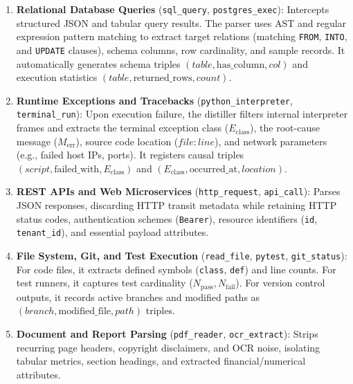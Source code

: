 \documentclass[lettersize,journal]{IEEEtran}
\begin{document}
\begin{enumerate}
    \item \textbf{Relational Database Queries} (\texttt{sql\_query}, \texttt{postgres\_exec}): Intercepts structured JSON and tabular query results. The parser uses AST and regular expression pattern matching to extract target relations (matching \texttt{FROM}, \texttt{INTO}, and \texttt{UPDATE} clauses), schema columns, row cardinality, and sample records. It automatically generates schema triples $(table, \text{has\_column}, col)$ and execution statistics $(table, \text{returned\_rows}, count)$.
    \item \textbf{Runtime Exceptions and Tracebacks} (\texttt{python\_interpreter}, \texttt{terminal\_run}): Upon execution failure, the distiller filters internal interpreter frames and extracts the terminal exception class ($E_{\text{class}}$), the root-cause message ($M_{\text{err}}$), source code location ($file:line$), and network parameters (e.g., failed host IPs, ports). It registers causal triples $(script, \text{failed\_with}, E_{\text{class}})$ and $(E_{\text{class}}, \text{occurred\_at}, location)$.
    \item \textbf{REST APIs and Web Microservices} (\texttt{http\_request}, \texttt{api\_call}): Parses JSON responses, discarding HTTP transit metadata while retaining HTTP status codes, authentication schemes (\texttt{Bearer}), resource identifiers (\texttt{id}, \texttt{tenant\_id}), and essential payload attributes.
    \item \textbf{File System, Git, and Test Execution} (\texttt{read\_file}, \texttt{pytest}, \texttt{git\_status}): For code files, it extracts defined symbols (\texttt{class}, \texttt{def}) and line counts. For test runners, it captures test cardinality ($N_{\text{pass}}, N_{\text{fail}}$). For version control outputs, it records active branches and modified paths as $(branch, \text{modified\_file}, path)$ triples.
    \item \textbf{Document and Report Parsing} (\texttt{pdf\_reader}, \texttt{ocr\_extract}): Strips recurring page headers, copyright disclaimers, and OCR noise, isolating tabular metrics, section headings, and extracted financial/numerical attributes.
\end{enumerate}
\end{document}
